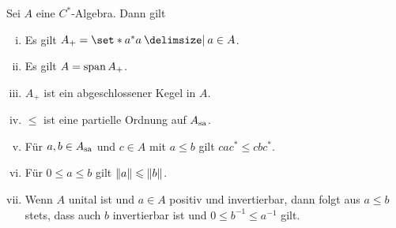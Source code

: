 \begin{satz}[label=satz:37,{name=[Eigenschaften positiver Elemente]}]
	Sei $A$ eine $C^*$-Algebra. Dann gilt
	\begin{enumerate}[(i),itemsep=2pt]
		\item Es gilt $A_+ = \set*{a^*a \given a \in A}$.
		\item Es gilt $A = \Span A_+$.
		\item $A_+$ ist ein abgeschlossener Kegel in $A$.
		\item $\le$ ist eine partielle Ordnung auf $A_\sa$.
		\item Für $a,b \in A_\sa$ und $c \in A$ mit $a \le b$ gilt $c a c^* \le c b c^*$.
		\item Für $0 \le a \le b$ gilt $\norm*{a} \le \norm*{b}$.
		\item Wenn $A$ unital ist und $a \in A$ positiv und invertierbar, dann folgt aus $a \le b$ stets, dass auch $b$ invertierbar ist und $0 \le b^{-1} \le a^{-1}$ gilt.
	\end{enumerate}
\end{satz}
